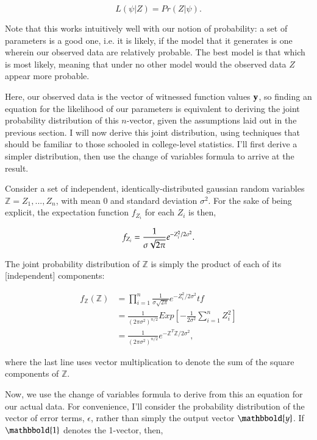 \begin{equation} \label{eq:def_likelihood}
L(\psi|Z) = Pr(Z|\psi).
\end{equation}

Note that this works intuitively well with our notion of probability: a set of parameters is a good one, i.e. it is likely, if the model that it generates is one wherein our observed data are relatively probable. The best model is that which is most likely, meaning that under no other model would the observed data $Z$ appear more probable.

Here, our observed data is the vector of witnessed function values $\mathbf{y}$, so finding an equation for the likelihood of our parameters is equivalent to deriving the joint probability distribution of this $n$-vector, given the assumptions laid out in the previous section. I will now derive this joint distribution, using techniques that should be familiar to those schooled in college-level statistics. I'll first derive a simpler distribution, then use the change of variables formula to arrive at the result.

Consider a set of independent, identically-distributed gaussian random variables $\mathbb{Z} = Z_1,...,Z_n$, with mean 0 and standard deviation $\sigma^2$. For the sake of being explicit, the expectation function $f_{Z_i}$ for each $Z_i$ is then,

\begin{equation} \label{eq:f_{Z_i}}
f_{Z_i}=\frac{1}{\sigma\sqrt{2\pi}}e^{-Z_i^2/2\sigma^2}.
\end{equation}

The joint probability distribution of $\mathbb{Z}$ is simply the product of each of its [independent] components:

\begin{align}  \label{eq:F_Z}
f_\mathbb{Z}(\mathbb{Z}) &= \prod_{i=1}^n \frac{1}{\sigma\sqrt{2\pi}}e^{-Z_i^2/2\sigma^2}tf  \\
			 &= \frac{1}{(2\pi\sigma^2)^{n/2}} {E}xp\left [ -\frac{1}{2\sigma^2}\sum_{i=1}^{n} Z_i^2\right ] \nonumber\\
			 &= \frac{1}{(2\pi\sigma^2)^{n/2}} e^{-\mathbb{Z}^T\mathbb{Z}/2\sigma^2},\nonumber
\end{align}

where the last line uses vector multiplication to denote the sum of the square components of $\mathbb{Z}$.

Now, we use the change of variables formula to derive from this an equation for our actual data. For convenience, I'll consider the probability distribution of the vector of error terms, $\mathbb{\epsilon}$, rather than simply the output vector $\mathbbold{y}$. If $\mathbbold{1}$ denotes the 1-vector, then,

